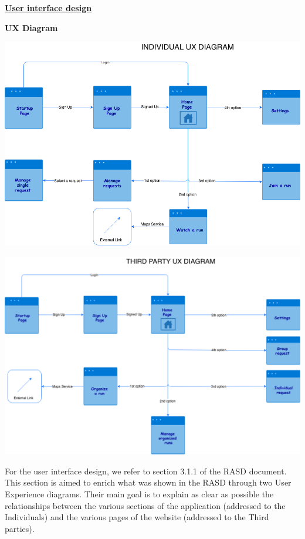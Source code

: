 	\underline{\textbf{User interface design}}
	\begin{legal}
	\item \textbf{UX Diagram}
	\begin{center}
		\includegraphics[width=16cm]{../images/design/IndividualUX.png}
	\end{center}
	\begin{center}
		\includegraphics[width=16cm]{../images/design/ThirdPartyUX.png}
	\end{center}
	\end{legal}
\newpage
For the user interface design, we refer to section 3.1.1 of the RASD document. This section is aimed to enrich what was shown in the RASD through two User Experience diagrams. Their main goal is to explain as clear as possible the relationships between the various sections of the application (addressed to the Individuals) and the various pages of the website (addressed to the Third parties).\\
